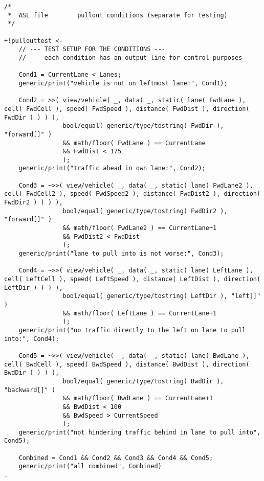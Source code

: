 \begin{lstlisting}[style=asl, 
                   keywords={}, 
                   keywords={[2]}, 
                   keywords={[3]}, 
                   caption={Agentenscript: Auszug Bedingungen pullout-Plan},
                   label={lst:pullout-cond}]      
/*
 *  ASL file        pullout conditions (separate for testing)
 */

+!pullouttest <-
    // --- TEST SETUP FOR THE CONDITIONS ---
    // --- each condition has an output line for control purposes ---

    Cond1 = CurrentLane < Lanes; 
    generic/print("vehicle is not on leftmost lane:", Cond1); 

    Cond2 = >>( view/vehicle( _, data( _, static( lane( FwdLane ), cell( FwdCell ), speed( FwdSpeed ), distance( FwdDist ), direction( FwdDir ) ) ) ),
                bool/equal( generic/type/tostring( FwdDir ), "forward[]" ) 
                && math/floor( FwdLane ) == CurrentLane
                && FwdDist < 175 
                ); 
    generic/print("traffic ahead in own lane:", Cond2); 

    Cond3 = ~>>( view/vehicle( _, data( _, static( lane( FwdLane2 ), cell( FwdCell2 ), speed( FwdSpeed2 ), distance( FwdDist2 ), direction( FwdDir2 ) ) ) ),
                bool/equal( generic/type/tostring( FwdDir2 ), "forward[]" ) 
                && math/floor( FwdLane2 ) == CurrentLane+1
                && FwdDist2 < FwdDist 
                ); 
    generic/print("lane to pull into is not worse:", Cond3); 

    Cond4 = ~>>( view/vehicle( _, data( _, static( lane( LeftLane ), cell( LeftCell ), speed( LeftSpeed ), distance( LeftDist ), direction( LeftDir ) ) ) ),
                bool/equal( generic/type/tostring( LeftDir ), "left[]" ) 
                && math/floor( LeftLane ) == CurrentLane+1
                );
    generic/print("no traffic directly to the left on lane to pull into:", Cond4);

    Cond5 = ~>>( view/vehicle( _, data( _, static( lane( BwdLane ), cell( BwdCell ), speed( BwdSpeed ), distance( BwdDist ), direction( BwdDir ) ) ) ),
                bool/equal( generic/type/tostring( BwdDir ), "backward[]" ) 
                && math/floor( BwdLane ) == CurrentLane+1
                && BwdDist < 100
                && BwdSpeed > CurrentSpeed 
                );
    generic/print("not hindering traffic behind in lane to pull into", Cond5);

    Combined = Cond1 && Cond2 && Cond3 && Cond4 && Cond5;
    generic/print("all combined", Combined)
.\end{lstlisting}

